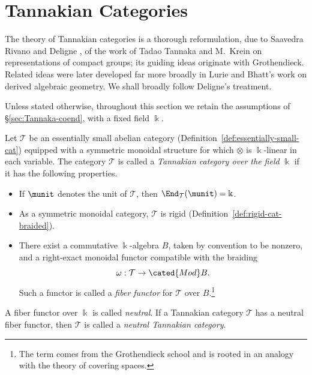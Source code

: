 
\section{Tannakian Categories}\label{sec:Tannakian-cat}
\hypertarget{o014.aljabr2.chapter9.tannakian-a}{ }
The theory of Tannakian categories is a thorough reformulation, due to
Saavedra Rivano and Deligne \cite{Sa72,Del90}, of the work of Tadao Tannaka
\cite{Ta38} and M.\ Krein \cite{Kr49} on representations of compact groups;
its guiding ideas originate with Grothendieck. Related ideas were later
developed far more broadly in Lurie and Bhatt's work on derived algebraic
geometry. We shall broadly follow Deligne's treatment.

Unless stated otherwise, throughout this section we retain the assumptions of
\S\ref{sec:Tannaka-coend}, with a fixed field $\Bbbk$.

\begin{definition}\label{def:Tannakian-cat}
	Let $\mathcal{T}$ be an essentially small abelian category
	(Definition~\ref{def:essentially-small-cat}) equipped with a symmetric
	monoidal structure for which $\otimes$ is $\Bbbk$-linear in each
	variable. The category $\mathcal{T}$ is called a \emph{Tannakian category
	over the field $\Bbbk$} if it has the following properties.
	\begin{itemize}
		\item If $\munit$ denotes the unit of $\mathcal{T}$, then
		$\End_{\mathcal{T}}(\munit)=\Bbbk$.
		\item As a symmetric monoidal category, $\mathcal{T}$ is rigid
		(Definition~\ref{def:rigid-cat-braided}).
		\item There exist a commutative $\Bbbk$-algebra $B$, taken by
		convention to be nonzero, and a right-exact monoidal functor compatible
		with the braiding
		\[ \omega: \mathcal{T} \to \cated{Mod}B. \]
		Such a functor is called a \emph{fiber functor} for $\mathcal{T}$ over
		$B$.\footnote{The term comes from the Grothendieck school and is rooted
		in an analogy with the theory of covering spaces.}
	\end{itemize}

	A fiber functor over $\Bbbk$ is called \emph{neutral}. If a Tannakian
	category $\mathcal{T}$ has a neutral fiber functor, then $\mathcal{T}$ is
	called a \emph{neutral Tannakian category}.
\end{definition}

